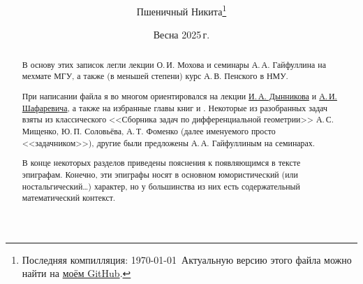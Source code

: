 \documentclass[a4paper, twoside, leqno, 11pt]{article}
\begin{document}
\title{\bfseries\scshape\course}
\date{Весна 2025\,г.}
\author{Пшеничный Никита\thanks{Последняя компилляция: \today\ Актуальную версию этого файла можно найти на \href{https://github.com/pshenikita/Differential-Geometry}{моём GitHub}.}}

\maketitle
\begin{abstract}
	В основу этих записок легли лекции О.\,И. Мохова и семинары А.\,А. Гайфуллина на мехмате МГУ, а также (в меньшей степени) курс А.\,В. Пенского в НМУ.

	При написании файла я во многом ориентировался на лекции \href{https://teach-in.ru/course/classical-difgeom-dynnikov}{И.\,А. Дынникова} и \href{https://teach-in.ru/course/differential-geometry-shafarevich}{А.\,И. Шафаревича}, а также на избранные главы книг \cite{NT14} и \cite{S19}. Некоторые из разобранных задач взяты из классического <<Сборника задач по дифференциальной геометрии>> А.\,С. Мищенко, Ю.\,П. Соловьёва, А.\,Т. Фоменко (далее именуемого просто <<задачником>>), другие были предложены А.\,А. Гайфуллиным на семинарах.

	В конце некоторых разделов приведены пояснения к появляющимся в тексте эпиграфам. Конечно, эти эпиграфы носят в основном юмористический (или ностальгический\ldots) характер, но у большинства из них есть содержательный математический контекст.

	
\end{abstract}

\tableofcontents








\end{document}

